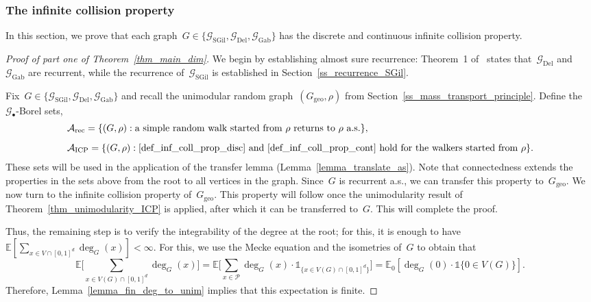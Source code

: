 \documentclass[a4paper,11pt]{article}
\newcommand{\EE}{\mathbb{E}}
\theoremstyle{definition}
\begin{document}
\subsubsection{The infinite collision property}\label{ss_prove_ICP_geo}
In this section, we prove that each graph~$G \in \{ \mathcal{G}_\mathrm{SGil}, \mathcal{G}_\mathrm{Del},\mathcal{G}_\mathrm{Gab} \}$ has the discrete and continuous infinite collision property.
\begin{proof}[Proof of part one of Theorem~\ref{thm_main_dim}] 
We begin by establishing almost sure recurrence: Theorem~1 of~\cite{recurrenceVoronoiPPP} states that~$\mathcal{G}_{\mathrm{Del}}$ and~$\mathcal{G}_{\mathrm{Gab}}$ are recurrent, while the recurrence of~$\mathcal G_\mathrm{SGil}$ is established in Section~\ref{ss_recurrence_SGil}. 

Fix~$G \in \{ \mathcal{G}_\mathrm{SGil}, \mathcal{G}_\mathrm{Del},\mathcal{G}_\mathrm{Gab} \}$ and recall the unimodular random graph~$(G_\mathrm{geo},\rho)$ from Section~\ref{ss_mass_transport_principle}. Define the~$\mathcal G_\bullet$-Borel sets,
\begin{align*}
& \mathcal A_\mathrm{rec} = \{ (G,\rho): \text{a simple random walk started from } \rho \text{ returns to } \rho \text{ a.s.} \}, \\[2mm]
& \mathcal A_\mathrm{ICP} = \{(G,\rho): \eqref{def_inf_coll_prop_disc} \text{ and } \eqref{def_inf_coll_prop_cont} \text{ hold for the walkers started from } \rho \}.
\end{align*}
These sets will be used in the application of the transfer lemma (Lemma~\ref{lemma_translate_as}). Note that connectedness extends the properties in the sets above from the root to all vertices in the graph. Since~$G$ is recurrent a.s., we can transfer this property to~$G_\mathrm{geo}$. We now turn to the infinite collision property of~$G_{\mathrm{geo}}$. This property will follow once the unimodularity result of Theorem~\ref{thm_unimodularity_ICP} is applied, after which it can be transferred to~$G$. This will complete the proof.

Thus, the remaining step is to verify the integrability of the degree at the root; for this, it is enough to have~$\EE[ \sum_{x \in V \cap [0,1]^d} \deg_G(x) ]  < \infty$. For this, we use the Mecke equation and the isometries of~$G$ to obtain that
$$ \EE \Big[ \sum_{x \in V(G) \cap [0,1]^d} \deg_G(x) \Big] = \EE \Big[ \sum_{x \in \mathcal P} \deg_G(x) \cdot \mathds{1}_{ \{ x \in V(G) \cap [0,1]^d\} } \Big] = \EE_0[\deg_G(0) \cdot \mathds{1} \{0 \in V(G) \} ].$$
Therefore, Lemma~\ref{lemma_fin_deg_to_unim} implies that this expectation is finite.
\end{proof}
\end{document}
